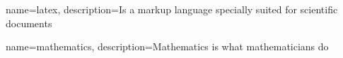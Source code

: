 {
    name=latex,
    description={Is a markup language specially suited
    for scientific documents}
}

{
    name=mathematics,
    description={Mathematics is what mathematicians do}
}
